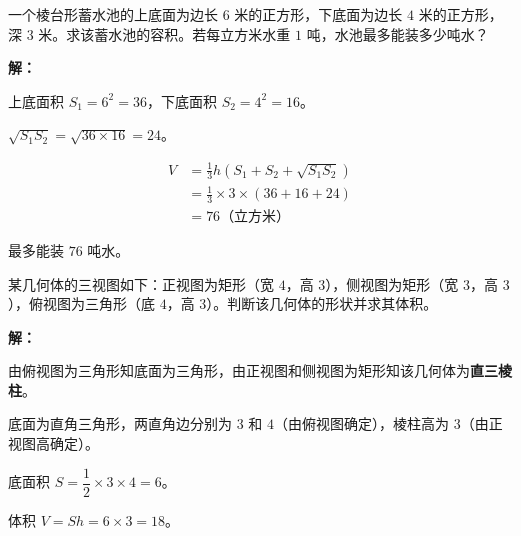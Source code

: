 \documentclass[12pt, a4paper]{ctexart}
\begin{document}
\begin{appbox}[【应用2】棱台形蓄水池]
一个棱台形蓄水池的上底面为边长 $6$ 米的正方形，下底面为边长 $4$ 米的正方形，深 $3$ 米。求该蓄水池的容积。若每立方米水重 $1$ 吨，水池最多能装多少吨水？
\end{appbox}

\textbf{解：}

上底面积 $S_1 = 6^2 = 36$，下底面积 $S_2 = 4^2 = 16$。

$\sqrt{S_1 S_2} = \sqrt{36 \times 16} = 24$。

\begin{align*}
V &= \frac{1}{3}h\!\left(S_1 + S_2 + \sqrt{S_1 S_2}\right) \\
  &= \frac{1}{3} \times 3 \times (36 + 16 + 24) \\
  &= 76 \text{（立方米）}
\end{align*}

最多能装 $76$ 吨水。

\vspace{6pt}

\begin{appbox}[【应用3】三视图还原与体积]
某几何体的三视图如下：正视图为矩形（宽 $4$，高 $3$），侧视图为矩形（宽 $3$，高 $3$），俯视图为三角形（底 $4$，高 $3$）。判断该几何体的形状并求其体积。
\end{appbox}

\textbf{解：}

由俯视图为三角形知底面为三角形，由正视图和侧视图为矩形知该几何体为\textbf{直三棱柱}。

底面为直角三角形，两直角边分别为 $3$ 和 $4$（由俯视图确定），棱柱高为 $3$（由正视图高确定）。

底面积 $S = \dfrac{1}{2} \times 3 \times 4 = 6$。

体积 $V = Sh = 6 \times 3 = 18$。

\begin{center}
\end{center}

\end{document}
